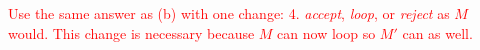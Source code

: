 \textcolor{red}{
Use the same answer as (b) with one change: 4. \emph{accept}, \emph{loop}, or \emph{reject} as $M$ would.\newp
This change is necessary because $M$ can now loop so $M'$ can as well.
}